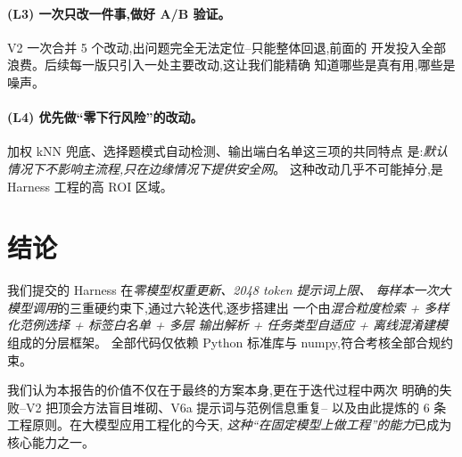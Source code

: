 \documentclass[10pt,twocolumn,letterpaper]{article}
\begin{document}
\paragraph{(L3) 一次只改一件事,做好 A/B 验证。}
V2 一次合并 5 个改动,出问题完全无法定位--只能整体回退,前面的
开发投入全部浪费。后续每一版只引入一处主要改动,这让我们能精确
知道哪些是真有用,哪些是噪声。

\paragraph{(L4) 优先做``零下行风险''的改动。}
加权 kNN 兜底、选择题模式自动检测、输出端白名单这三项的共同特点
是:\emph{默认情况下不影响主流程,只在边缘情况下提供安全网}。
这种改动几乎不可能掉分,是 Harness 工程的高 ROI 区域。

\section{结论}
\label{sec:concl}

我们提交的 Harness 在\emph{零模型权重更新、2048 token 提示词上限、
每样本一次大模型调用}的三重硬约束下,通过六轮迭代,逐步搭建出
一个由\emph{混合粒度检索 + 多样化范例选择 + 标签白名单 + 多层
输出解析 + 任务类型自适应 + 离线混淆建模}组成的分层框架。
全部代码仅依赖 Python 标准库与 numpy,符合考核全部合规约束。

我们认为本报告的价值不仅在于最终的方案本身,更在于迭代过程中两次
明确的失败--V2 把顶会方法盲目堆砌、V6a 提示词与范例信息重复--
以及由此提炼的 6 条工程原则。在大模型应用工程化的今天,
\emph{这种``在固定模型上做工程''的能力}已成为核心能力之一。
\end{document}
